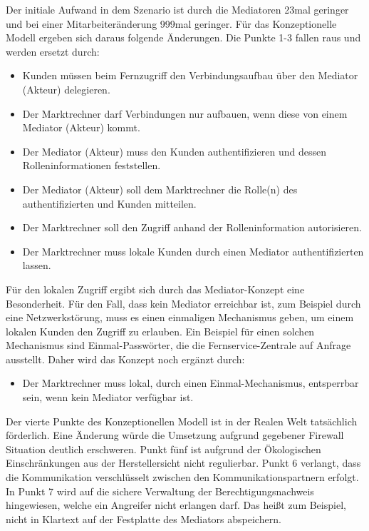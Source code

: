 \documentclass[11pt,a4paper]{report}
\begin{document}
Der initiale Aufwand in dem Szenario ist durch die Mediatoren 23mal geringer und bei einer Mitarbeiteränderung 999mal geringer. Für das Konzeptionelle Modell ergeben sich daraus folgende Änderungen. Die Punkte 1-3 fallen raus und werden ersetzt durch:

\begin{itemize}[leftmargin=*]
\item Kunden müssen beim Fernzugriff den Verbindungsaufbau über den Mediator (Akteur) delegieren.
\item Der Marktrechner darf Verbindungen nur aufbauen, wenn diese von einem Mediator (Akteur) kommt.
\item Der Mediator (Akteur) muss den Kunden authentifizieren und dessen Rolleninformationen feststellen.
\item Der Mediator (Akteur) soll dem Marktrechner die Rolle(n) des authentifizierten und Kunden mitteilen.
\item Der Marktrechner soll den Zugriff anhand der Rolleninformation autorisieren.
\item Der Marktrechner muss lokale Kunden durch einen Mediator authentifizierten lassen.
\end{itemize}

Für den lokalen Zugriff ergibt sich durch das Mediator-Konzept eine Besonderheit. Für den Fall, dass kein Mediator erreichbar ist, zum Beispiel durch eine Netzwerkstörung, muss es einen einmaligen Mechanismus geben, um einem lokalen Kunden den Zugriff zu erlauben. Ein Beispiel für einen solchen Mechanismus sind Einmal-Passwörter, die die Fernservice-Zentrale auf Anfrage ausstellt. Daher wird das Konzept noch ergänzt durch:

\begin{itemize}[leftmargin=*]
\item Der Marktrechner muss lokal, durch einen Einmal-Mechanismus, entsperrbar sein, wenn kein Mediator verfügbar ist.
\end{itemize}

Der vierte Punkte des Konzeptionellen Modell ist in der Realen Welt tatsächlich förderlich. Eine Änderung würde die Umsetzung aufgrund gegebener Firewall Situation deutlich erschweren. Punkt fünf ist aufgrund der Ökologischen Einschränkungen aus der Herstellersicht nicht regulierbar. Punkt 6 verlangt, dass die Kommunikation verschlüsselt zwischen den Kommunikationspartnern erfolgt. In Punkt 7 wird auf die sichere Verwaltung der Berechtigungsnachweis hingewiesen, welche ein Angreifer nicht erlangen darf. Das heißt zum Beispiel, nicht in Klartext auf der Festplatte des Mediators abspeichern.
\end{document}
